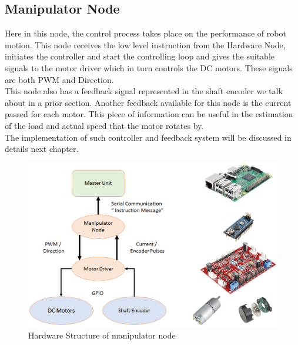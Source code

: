 \documentclass[12pt]{article}
\begin{document}
\newpage

\subsection{Manipulator Node}
	Here in this node, the control process takes place on the performance of robot motion. This node receives the low level instruction from the Hardware Node, initiates the controller and start the controlling loop and gives the suitable signals to the motor driver which in turn controls the DC motors. These signals are both PWM and Direction. \\
	This node also has a feedback signal represented in the shaft encoder we talk about in a prior section. Another feedback available for this node is the current passed for each motor. This piece of information can be useful in the estimation of the load and actual speed that the motor rotates by.\\
	The implementation of such controller and feedback system will be discussed in details next chapter.
	\begin{figure}[H]
		\centering
		\includegraphics[width =1\textwidth]{Fig/manipulator-node.png}
		\caption{Hardware Structure of manipulator node}
		\label{fig:manipulator-node}
	\end{figure}

\newpage
\end{document}
